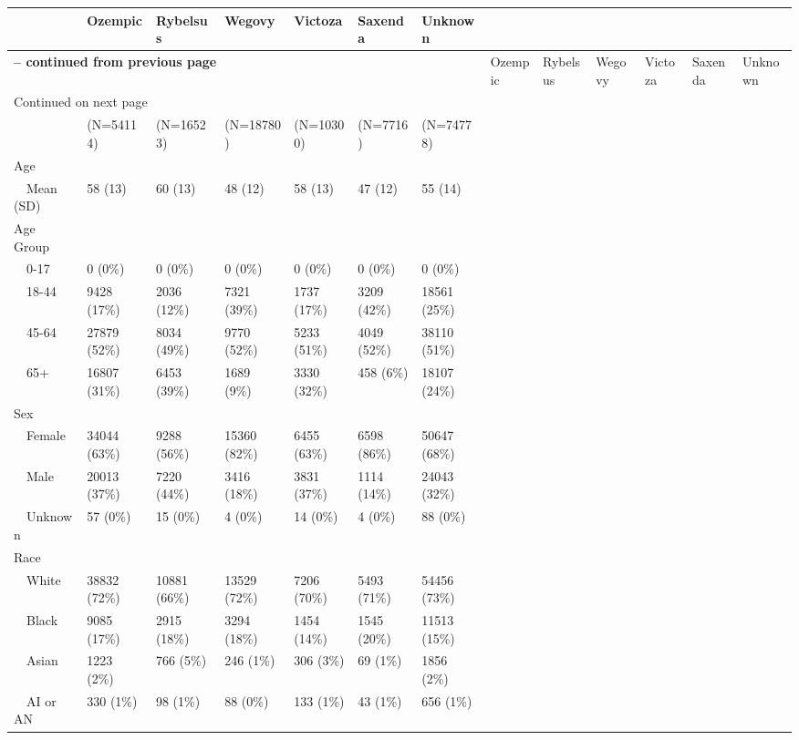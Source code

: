 \begin{longtable}{p{}p{}p{}p{}p{}p{}p{}}
   & Ozempic & Rybelsus & Wegovy & Victoza & Saxenda & Unknown \\ 
  \hline 
\endfirsthead 
\multicolumn{7}{p{\textwidth}}{{ \bfseries \tablename \thetable{} -- continued from previous page}} \ 
\hline Feature & Ozempic & Rybelsus & Wegovy & Victoza & Saxenda & Unknown\\ \hline 
\endhead 
\hline \multicolumn{7}{p{\textwidth}}{{Continued on next page}} \\ \hline 
\endfoot 
\hline 
\endlastfoot 
 \hline
 & (N=54114) & (N=16523) & (N=18780) & (N=10300) & (N=7716) & (N=74778) \\ 
  Age &  &  &  &  &  &  \\ 
    Mean (SD) & 58 (13) & 60 (13) & 48 (12) & 58 (13) & 47 (12) & 55 (14) \\ 
  Age Group &  &  &  &  &  &  \\ 
    0-17 & 0 (0\%) & 0 (0\%) & 0 (0\%) & 0 (0\%) & 0 (0\%) & 0 (0\%) \\ 
    18-44 & 9428 (17\%) & 2036 (12\%) & 7321 (39\%) & 1737 (17\%) & 3209 (42\%) & 18561 (25\%) \\ 
    45-64 & 27879 (52\%) & 8034 (49\%) & 9770 (52\%) & 5233 (51\%) & 4049 (52\%) & 38110 (51\%) \\ 
    65+ & 16807 (31\%) & 6453 (39\%) & 1689 (9\%) & 3330 (32\%) & 458 (6\%) & 18107 (24\%) \\ 
  Sex &  &  &  &  &  &  \\ 
    Female & 34044 (63\%) & 9288 (56\%) & 15360 (82\%) & 6455 (63\%) & 6598 (86\%) & 50647 (68\%) \\ 
    Male & 20013 (37\%) & 7220 (44\%) & 3416 (18\%) & 3831 (37\%) & 1114 (14\%) & 24043 (32\%) \\ 
    Unknown & 57 (0\%) & 15 (0\%) & 4 (0\%) & 14 (0\%) & 4 (0\%) & 88 (0\%) \\ 
  Race &  &  &  &  &  &  \\ 
    White & 38832 (72\%) & 10881 (66\%) & 13529 (72\%) & 7206 (70\%) & 5493 (71\%) & 54456 (73\%) \\ 
    Black & 9085 (17\%) & 2915 (18\%) & 3294 (18\%) & 1454 (14\%) & 1545 (20\%) & 11513 (15\%) \\ 
    Asian & 1223 (2\%) & 766 (5\%) & 246 (1\%) & 306 (3\%) & 69 (1\%) & 1856 (2\%) \\ 
    AI or AN & 330 (1\%) & 98 (1\%) & 88 (0\%) & 133 (1\%) & 43 (1\%) & 656 (1\%) \\ 

\end{longtable}

